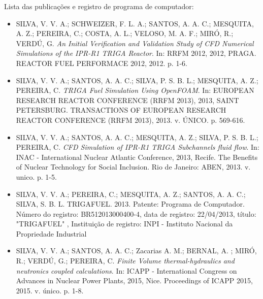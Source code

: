\documentclass[12pt,openright,twoside,a4paper,english,french,spanish,brazil]{abntex2}
\begin{document}
\begin{anexosenv}

\partanexos

%

Lista das publicações e registro de programa de computador:

\begin{itemize}
\item SILVA, V. V. A.; SCHWEIZER, F. L. A.; SANTOS, A. A. C.; MESQUITA, A. Z.; PEREIRA, C.; COSTA, A. L.; VELOSO, M. A. F.; MIRÓ, R.; VERDÚ, G. \textit{An Initial Verification and Validation Study of CFD Numerical Simulations of the IPR-R1 TRIGA Reactor}. In: RRFM 2012, 2012, PRAGA. REACTOR FUEL PERFORMACE 2012, 2012. p. 1-6.

\item SILVA, V. V. A.; SANTOS, A. A. C.; SILVA, P. S. B. L.; MESQUITA, A. Z.; PEREIRA, C. \textit{TRIGA Fuel Simulation Using OpenFOAM}. In: EUROPEAN RESEARCH REACTOR CONFERENCE (RRFM 2013), 2013, SAINT PETERSBURG. TRANSACTIONS OF EUROPEAN RESEARCH REACTOR CONFERENCE (RRFM 2013), 2013. v. ÚNICO. p. 569-616.

\item SILVA, V. V. A.; SANTOS, A. A. C.; MESQUITA, A. Z.; SILVA, P. S. B. L.; PEREIRA, C. \textit{CFD Simulation of IPR-R1 TRIGA Subchannels fluid flow}. In: INAC - International Nuclear Atlantic Conference, 2013, Recife. The Benefits of Nuclear Technology for Social Inclusion. Rio de Janeiro: ABEN, 2013. v. unico. p. 1-5.

\item SILVA, V. V. A.; PEREIRA, C.; MESQUITA, A. Z.; SANTOS, A. A. C.; SILVA, S. B. L. TRIGAFUEL. 2013.
  Patente: Programa de Computador. Número do registro: BR512013000400-4, data de registro: 22/04/2013, título: "TRIGAFUEL" , Instituição de registro: INPI - Instituto Nacional da Propriedade Industrial

\item SILVA, V. V. A.; SANTOS, A. A. C.; Zacarias A. M.; BERNAL, A. ; MIRÓ, R.; VERDÚ, G.; PEREIRA, C. \textit{Finite Volume thermal-hydraulics and neutronics coupled calculations}. In: ICAPP - International Congress on Advances in Nuclear Power Plants, 2015, Nice. Proceedings of ICAPP 2015, 2015. v. único. p. 1-8.


\end{itemize}
\end{anexosenv}
\end{document}
